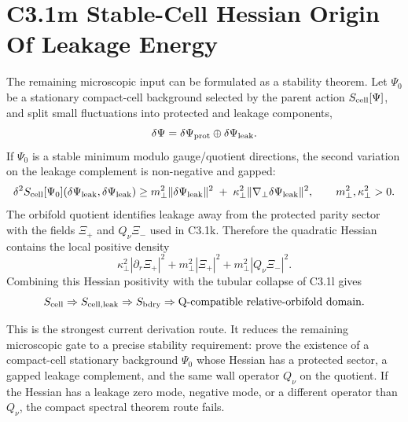 \documentclass[11pt]{article}
\begin{document}
\section{C3.1m Stable-Cell Hessian Origin Of Leakage Energy}
The remaining microscopic input can be formulated as a stability theorem.  Let
$\Psi_0$ be a stationary compact-cell background selected by the parent action
$S_{\rm cell}[\Psi]$, and split small fluctuations into protected and leakage
components,
\begin{equation}
\delta\Psi=\delta\Psi_{\rm prot}\oplus\delta\Psi_{\rm leak} .
\end{equation}
If $\Psi_0$ is a stable minimum modulo gauge/quotient directions, the second
variation on the leakage complement is non-negative and gapped:
\begin{equation}
\delta^2S_{\rm cell}[\Psi_0](\delta\Psi_{\rm leak},\delta\Psi_{\rm leak})
\geq
m_\perp^2\|\delta\Psi_{\rm leak}\|^2
\;+\;
\kappa_\perp^2\|\nabla_\perp\delta\Psi_{\rm leak}\|^2,
\qquad
m_\perp^2,\kappa_\perp^2>0 .
\end{equation}
The orbifold quotient identifies leakage away from the protected parity sector
with the fields $\Xi_+$ and $Q_\nu\Xi_-$ used in C3.1k.  Therefore the quadratic
Hessian contains the local positive density
\begin{equation}
\kappa_\perp^2|\partial_r\Xi_+|^2
+m_\perp^2|\Xi_+|^2
+m_\perp^2|Q_\nu\Xi_-|^2 .
\end{equation}
Combining this Hessian positivity with the tubular collapse of C3.1l gives
\begin{equation}
S_{\rm cell}
\Rightarrow
S_{\rm cell,leak}
\Rightarrow
S_{\rm bdry}
\Rightarrow
\text{Q-compatible relative-orbifold domain} .
\end{equation}

This is the strongest current derivation route.  It reduces the remaining
microscopic gate to a precise stability requirement: prove the existence of a
compact-cell stationary background $\Psi_0$ whose Hessian has a protected sector,
a gapped leakage complement, and the same wall operator $Q_\nu$ on the quotient.
If the Hessian has a leakage zero mode, negative mode, or a different operator
than $Q_\nu$, the compact spectral theorem route fails.
\end{document}
